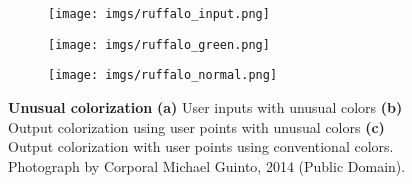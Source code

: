 \documentclass[acmtog,authorversion]{acmart}
\begin{document}
\begin{figure}[t!]
    \begin{subfigure}[t]{0.15\textwidth}
        \centering
        \texttt{[image: imgs/ruffalo\_input.png]}
        \caption{}
    \end{subfigure}
    \begin{subfigure}[t]{0.15\textwidth}
        \centering
        \texttt{[image: imgs/ruffalo\_green.png]}    
        \caption{}
    \end{subfigure}
    \begin{subfigure}[t]{0.15\textwidth}
        \centering
        \texttt{[image: imgs/ruffalo\_normal.png]}
        \caption{}
    \end{subfigure}
    \vspace{-3mm}
\caption{\textbf{Unusual colorization} \textbf{(a)} User inputs with unusual colors \textbf{(b)} Output colorization using user points with unusual colors \textbf{(c)} Output colorization with user points using conventional colors. Photograph by Corporal Michael Guinto, 2014 (Public Domain).
}
\label{fig:unusual}
\vspace{-4mm}
\end{figure}
\end{document}
